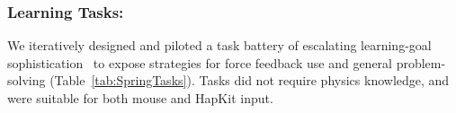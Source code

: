 \subsubsection{Learning Tasks:}
We iteratively designed and piloted a task battery of escalating learning-goal sophistication~\cite{bloom1969taxonomy} to
expose strategies for force feedback use and general problem-solving (Table~\ref{tab:SpringTasks}).
Tasks did not require physics knowledge,
and were suitable for both mouse and HapKit input.

